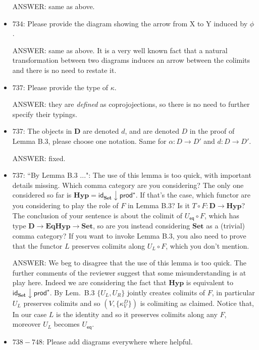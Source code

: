 \documentclass[english,11pt,a4paper]{article}
\begin{document}
\begin{itemize}
ANSWER: same as above.

\item $734$: Please provide the diagram showing the arrow from X to Y induced by $\phi$.

ANSWER: same as above. It is a very well known fact that a natural transformation between two diagrams induces an arrow between the colimits and there is no need to restate it.


\item $737$: Please provide the type of $\kappa$.

ANSWER: they are \emph{defined} as coprojojections, so there is no need to further specify their typings.


\item $737$: The objects in $\mathbf{D}$ are denoted $d$, and are denoted $D$ in the proof of Lemma B.3, please choose one notation. Same for $\alpha: D \to  D'$ and $d: D \to  D'$.

ANSWER: fixed.

\item $737$: ``By Lemma B.3 ...": The use of this lemma is too quick, with important details missing. Which comma category are you considering? The only one considered so far is $\mathbf{Hyp} = \mathsf{id}_{\mathbf{Set}} \downarrow \mathsf{prod}^\star$. If that's the case, which functor are you considering to play the role of $F$ in Lemma B.3? Is it $T\circ F : \mathbf{D} \to  \mathbf{Hyp}$? The conclusion of your sentence is about the colimit of $U_{\mathsf{eq}}\circ F$, which has type $\mathbf{D} \to \mathbf{EqHyp} \to \mathbf{Set}$, so are you instead considering $\mathbf{Set}$ as a (trivial) comma category? If you want to invoke Lemma B.3, you also need to prove that the functor $L$ preserves colimits along $U_L \circ F$, which you don't mention.

ANSWER: We beg to disagree that the use of this lemma is too quick. The further comments of the reviewer suggest that some misunderstanding is at play here. Indeed we are considering the fact that $\mathbf{Hyp}$ is equivalent to $\mathsf{id}_{\mathbf{Set}} \downarrow \mathsf{prod}^\star$. By Lem.~B.3 $\{U_L, U_R\}$ jointly creates colimits of $F$, in particular $U_L$ preserves colimits and so $(V, \{\kappa^D_V\})$ is colimiting as claimed. Notice that, In our case $L$  is the identity and so it preserves colimits along any $F$, moreover $U_L$ becomes $U_{\mathsf{eq}}$.

\item $738-748$: Please add diagrams everywhere where helpful.


\end{itemize}
\end{document}
